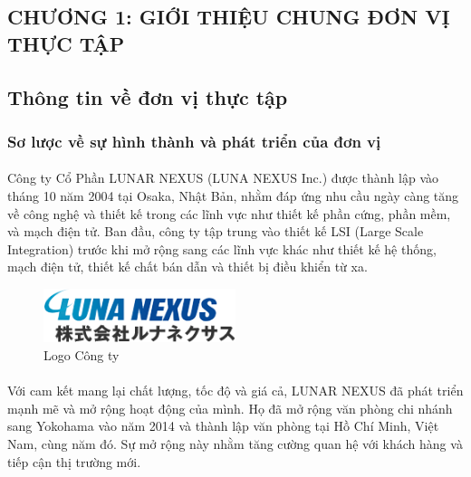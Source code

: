 	\begin{center}
		\setcounter{page}{2}
	\end{center}
	
	\begin{flushleft}
		
		\fontsize{16}{20}\selectfont
		\section*{CHƯƠNG 1: GIỚI THIỆU CHUNG ĐƠN VỊ THỰC TẬP }
		\fontsize{13}{13}\selectfont
        \setcounter{section}{1}


        \subsection{Thông tin về đơn vị thực tập}
		\subsubsection{Sơ lược về sự hình thành và phát triển của đơn vị}
		\paragraph{}
		Công ty Cổ Phần LUNAR NEXUS (LUNA NEXUS Inc.) được thành lập vào tháng 10 năm 2004 tại Osaka, Nhật Bản, nhằm đáp ứng nhu cầu ngày càng tăng về công nghệ và thiết kế trong các lĩnh vực như thiết kế phần cứng, phần mềm, và mạch điện tử. Ban đầu, công ty tập trung vào thiết kế LSI (Large Scale Integration) trước khi mở rộng sang các lĩnh vực khác như thiết kế hệ thống, mạch điện tử, thiết kế chất bán dẫn và thiết bị điều khiển từ xa.
		\begin{figure}[h]
			\centering
			\includegraphics[width=0.5\textwidth]{images/logo_luna_nexus.png}
			\caption{Logo Công ty}
			\label{fig:logo_cong_ty}
		\end{figure}
		\paragraph{}
		Với cam kết mang lại chất lượng, tốc độ và giá cả, LUNAR NEXUS đã phát triển mạnh mẽ và mở rộng hoạt động của mình. Họ đã mở rộng văn phòng chi nhánh sang Yokohama vào năm 2014 và thành lập văn phòng tại Hồ Chí Minh, Việt Nam, cùng năm đó. Sự mở rộng này nhằm tăng cường quan hệ với khách hàng và tiếp cận thị trường mới.

\end{flushleft}

